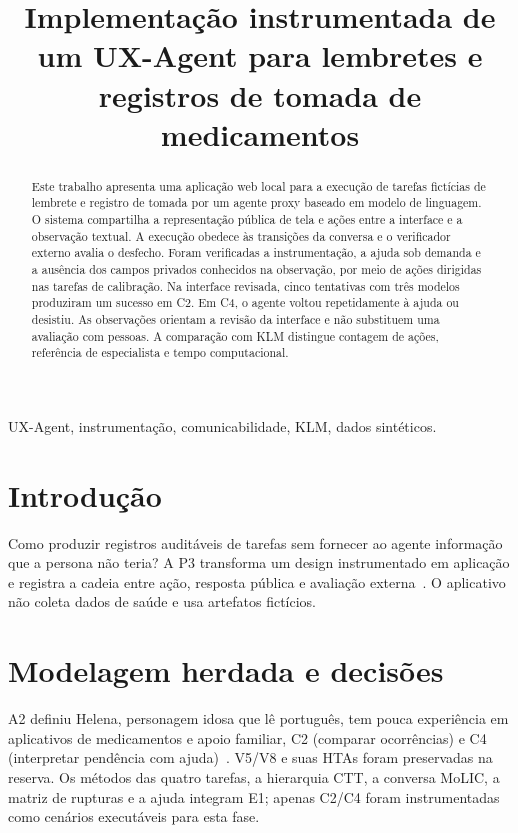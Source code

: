 \documentclass[conference,a4paper]{IEEEtran}
\title{Implementação instrumentada de um UX-Agent para lembretes e registros de tomada de medicamentos}
\begin{document}
\maketitle
\begin{abstract}
Este trabalho apresenta uma aplicação web local para a execução de tarefas fictícias de lembrete e registro de tomada por um agente proxy baseado em modelo de linguagem. O sistema compartilha a representação pública de tela e ações entre a interface e a observação textual. A execução obedece às transições da conversa e o verificador externo avalia o desfecho. Foram verificadas a instrumentação, a ajuda sob demanda e a ausência dos campos privados conhecidos na observação, por meio de ações dirigidas nas tarefas de calibração. Na interface revisada, cinco tentativas com três modelos produziram um sucesso em C2. Em C4, o agente voltou repetidamente à ajuda ou desistiu. As observações orientam a revisão da interface e não substituem uma avaliação com pessoas. A comparação com KLM distingue contagem de ações, referência de especialista e tempo computacional.
\end{abstract}
\begin{IEEEkeywords}
UX-Agent, instrumentação, comunicabilidade, KLM, dados sintéticos.
\end{IEEEkeywords}
\section{Introdução}
Como produzir registros auditáveis de tarefas sem fornecer ao agente informação que a persona não teria? A P3 transforma um design instrumentado em aplicação e registra a cadeia entre ação, resposta pública e avaliação externa~\cite{p3}. O aplicativo não coleta dados de saúde e usa artefatos fictícios.

\section{Modelagem herdada e decisões}
A2 definiu Helena, personagem idosa que lê português, tem pouca experiência em aplicativos de medicamentos e apoio familiar, C2 (comparar ocorrências) e C4 (interpretar pendência com ajuda)~\cite{a2}. V5/V8 e suas HTAs foram preservadas na reserva. Os métodos das quatro tarefas, a hierarquia CTT, a conversa MoLIC, a matriz de rupturas e a ajuda integram E1; apenas C2/C4 foram instrumentadas como cenários executáveis para esta fase.
\end{document}

